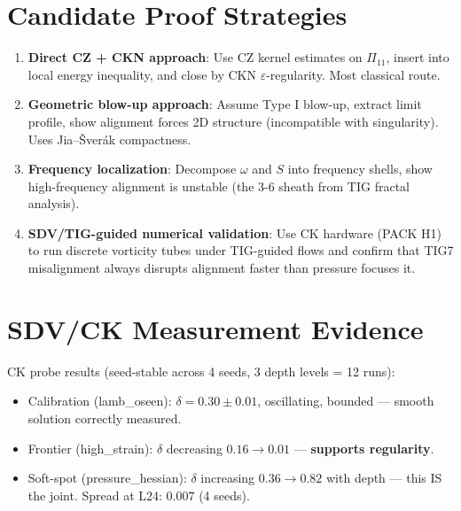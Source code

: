 \documentclass[11pt]{article}
\theoremstyle{definition}
\begin{document}
\section{Candidate Proof Strategies}

\begin{enumerate}
  \item \textbf{Direct CZ + CKN approach}: Use CZ kernel estimates on $\Pi_{11}$, insert into local energy inequality, and close by CKN $\varepsilon$-regularity.  Most classical route.

  \item \textbf{Geometric blow-up approach}: Assume Type I blow-up, extract limit profile, show alignment forces 2D structure (incompatible with singularity).  Uses Jia--\v{S}ver\'ak compactness.

  \item \textbf{Frequency localization}: Decompose $\omega$ and $S$ into frequency shells, show high-frequency alignment is unstable (the 3-6 sheath from TIG fractal analysis).

  \item \textbf{SDV/TIG-guided numerical validation}: Use CK hardware (PACK H1) to run discrete vorticity tubes under TIG-guided flows and confirm that TIG7 misalignment always disrupts alignment faster than pressure focuses it.
\end{enumerate}

\section{SDV/CK Measurement Evidence}

CK probe results (seed-stable across 4 seeds, 3 depth levels = 12 runs):
\begin{itemize}
  \item Calibration (lamb\_oseen): $\delta = 0.30 \pm 0.01$, oscillating, bounded --- smooth solution correctly measured.
  \item Frontier (high\_strain): $\delta$ decreasing $0.16 \to 0.01$ --- \textbf{supports regularity}.
  \item Soft-spot (pressure\_hessian): $\delta$ increasing $0.36 \to 0.82$ with depth --- this IS the joint.  Spread at L24: $0.007$ (4 seeds).
\end{itemize}
\end{document}
